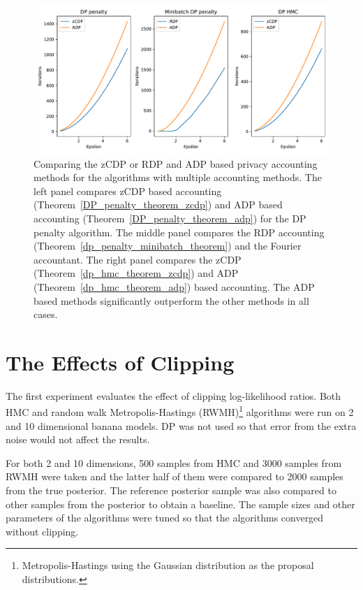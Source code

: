 \documentclass[english,twoside,openright]{HYgraduMLDS}
\begin{document}
\begin{figure}[h]
	\centering
  \includegraphics[width=\textwidth]{figures/accountant_comparison}
  \caption{
    Comparing the zCDP or RDP and ADP based privacy accounting methods
    for the algorithms with multiple accounting methods. The left panel
    compares zCDP based accounting (Theorem~\ref{DP_penalty_theorem_zcdp})
    and ADP based accounting (Theorem~\ref{DP_penalty_theorem_adp}) for
    the DP penalty algorithm. The middle panel compares the RDP accounting
    (Theorem~\ref{dp_penalty_minibatch_theorem}) and the Fourier accountant.
    The right panel compares the zCDP (Theorem~\ref{dp_hmc_theorem_zcdp})
    and ADP (Theorem~\ref{dp_hmc_theorem_adp}) based accounting.
    The ADP based methods significantly outperform the other methods
    in all cases.
  }
  \label{accounting_comparison_fig}
\end{figure}

\section{The Effects of Clipping}\label{clipping_experiments}

The first experiment evaluates the effect of clipping log-likelihood ratios.
Both HMC and random walk Metropolis-Hastings (RWMH)\footnote{Metropolis-Hastings using the Gaussian
distribution as the proposal distributions.}
algorithms were run on 2 and 10 dimensional banana models.
DP was not used so that error from the extra noise would not affect the results.

For both 2 and 10 dimensions, 500 samples from HMC and 3000 samples from
RWMH were taken and the latter half of them were
compared to 2000 samples from the true posterior. The reference posterior sample 
was also compared to other samples from the posterior to obtain a baseline.
The sample sizes and other parameters of the algorithms were tuned so that
the algorithms converged without clipping.
\end{document}

